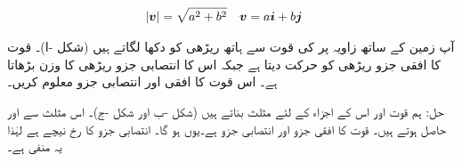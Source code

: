 \begin{align}
\abs{{{\boldsymbol{v}}}}&=\sqrt{a^2+b^2}&&{{\boldsymbol{v}}}=a{\boldsymbol{i}}+b{\boldsymbol{j}}
\end{align}

آپ زمین کے ساتھ  زاویہ پر  کی قوت  سے ہاتھ ریڑھی کو دکھا لگاتے ہیں (شکل -ا)۔ قوت کا افقی جزو ریڑھی کو حرکت دیتا ہے جبکہ اس کا انتصابی جزو ریڑھی کا وزن بڑھاتا ہے۔ اس قوت کا افقی اور انتصابی جزو معلوم کریں۔

حل:\quad
ہم قوت  اور اس کے اجزاء کے لئے مثلث  بناتے ہیں (شکل -ب اور شکل -ج)۔ اس مثلث سے  اور  حاصل ہوتے ہیں۔ قوت کا افقی جزو  اور انتصابی جزو  ہے۔یوں  ہو گا۔  انتصابی جزو کا رخ نیچے ہے لہٰذا یہ منفی ہے۔ 
